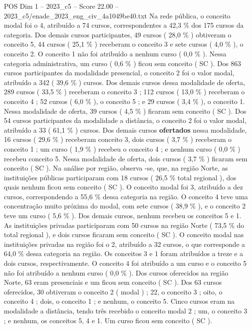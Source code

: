 \begin{textsample}{POS Dim 1 – 2023\_c5 – Score 22.00 – 2023\_c5/enade\_2023\_eng\_civ\_4a1049be40.txt}
Na rede pública, o conceito modal foi o 4, atribuído a 74 cursos, correspondentes a 42,3 \% dos 175 cursos da categoria.
Dos demais cursos participantes, 49 cursos ( 28,0 \% ) obtiveram o conceito 5, 44 cursos ( 25,1 \% ) receberam o conceito 3 e sete cursos ( 4,0 \% ), o conceito 2.
O conceito 1 não foi atribuído a nenhum curso ( 0,0 \% ).
Nessa categoria administrativa, um curso ( 0,6 \% ) ficou sem conceito ( SC ).
Dos 863 cursos participantes da modalidade presencial, o conceito 2 foi o valor modal, atribuído a 342 ( 39,6 \% ) cursos.
Dos demais cursos dessa modalidade de oferta, 289 cursos ( 33,5 \% ) receberam o conceito 3 ; 112 cursos ( 13,0 \% ) receberam o conceito 4 ; 52 cursos ( 6,0 \% ), o conceito 5 ; e 29 cursos ( 3,4 \% ), o conceito 1.
Nessa modalidade de oferta, 39 cursos ( 4,5 \% ) ficaram sem conceito ( SC ).
Dos 54 cursos participantes da modalidade a distância, o conceito 2 foi o valor modal, atribuído a 33 ( 61,1 \% ) cursos.
Dos demais cursos \textbf{ofertados} nessa modalidade, 16 cursos ( 29,6 \% ) receberam conceito 3, dois cursos ( 3,7 \% ) receberam o conceito 1 ; um curso ( 1,9 \% ) recebeu o conceito 4 ; e nenhum curso ( 0,0 \% ) recebeu conceito 5.
Nessa modalidade de oferta, dois cursos ( 3,7 \% ) ficaram sem conceito ( SC ).
Na análise por região, observa -se, que, na região Norte, as instituições públicas participaram com 18 cursos ( 26,5 \% total regional ), dos quais nenhum ficou sem conceito ( SC ).
O conceito modal foi 3, atribuído a dez cursos, correspondendo a 55,6 \% dessa categoria na região.
O conceito 4 teve uma concentração muito próxima do modal, com sete cursos ( 38,9 \% ), e o conceito 2 teve um curso ( 5,6 \% ).
Dos demais cursos, nenhum recebeu os conceitos 5 e 1.
As instituições privadas participaram com 50 cursos na região Norte ( 73,5 \% do total regional ), e dois cursos ficaram sem conceito ( SC ).
O conceito modal nas instituições privadas na região foi o 2, atribuído a 32 cursos, o que corresponde a 64,0 \% dessa categoria na região.
Os conceitos 3 e 1 foram atribuídos a treze e a dois cursos, respectivamente.
O conceito 4 foi atribuído a um curso e o conceito 5 não foi atribuído a nenhum curso ( 0,0 \% ).
Dos cursos oferecidos na região Norte, 63 eram presenciais e um ficou sem conceito ( SC ).
Dos 63 cursos oferecidos, 30 obtiveram o conceito 2 ( modal ) ; 22, o conceito 3 ; oito, o conceito 4 ; dois, o conceito 1 ; e nenhum, o conceito 5.
Cinco cursos eram na modalidade a distância, tendo três recebido o conceito modal 2 ; um, o conceito 3 ; e nenhum, os conceitos 5, 4 e 1.
Um curso ficou sem conceito ( SC ).

\end{textsample}
